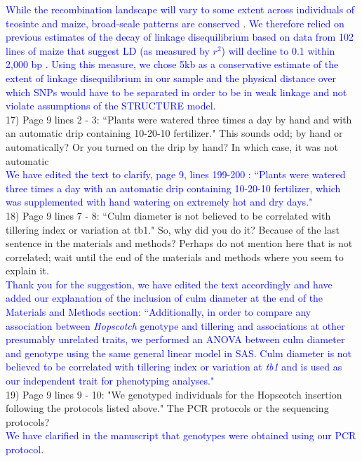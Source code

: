 \documentclass[11pt]{article}
\newcommand{\res}[1]{\noindent \textcolor{blue}{{#1}} \\}
\begin{document}
\res{While the recombination landscape will vary to some extent across individuals of teosinte and maize, broad-scale patterns are conserved \citep{bauer2013}.  We therefore relied on previous estimates of the decay of linkage disequilibrium based on data from 102 lines of maize that suggest LD (as measured by $r^2$) will decline to 0.1 within 2,000 bp \citep{Remington2001}.  Using this measure, we chose 5kb as a conservative estimate of the extent of linkage disequilibrium in our sample and the physical distance over which SNPs would have to be separated in order to be in weak linkage and not violate assumptions of the STRUCTURE model.}

17) Page 9 lines 2 - 3: ``Plants were watered three times a day by hand and with an automatic drip containing 10-20-10 fertilizer." This sounds odd; by hand or automatically? Or you turned on the drip by hand? In which case, it was not automatic\\

\res{We have edited the text to clarify, page 9, lines 199-200 : ``Plants were watered three times a day with an automatic drip containing 10-20-10 fertilizer, which was supplemented with hand watering on extremely hot and dry days."}

18) Page 9 lines 7 - 8: ``Culm diameter is not believed to be correlated with tillering index or variation at tb1." So, why did you do it? Because of the last sentence in the materials and methods? Perhaps do not mention here that is not correlated; wait until the end of the materials and methods where you seem to explain it.\\ 

\res{Thank you for the suggestion, we have edited the text accordingly and have added our explanation of the inclusion of culm diameter at the end of the Materials and Methods section: ``Additionally, in order to compare any association between \emph{Hopscotch} genotype and tillering and associations at other presumably unrelated traits, we performed an ANOVA between culm diameter and genotype using the same general linear model in SAS. Culm diameter is not believed to be correlated with tillering index or variation at \emph{tb1} and is used as our independent trait for phenotyping analyses."}

19) Page 9 lines 9 - 10: "We genotyped individuals for the Hopscotch insertion following the protocols listed above." The PCR protocols or the sequencing protocols?\\ 

\res{We have clarified in the manuscript that genotypes were obtained using our PCR protocol.}
\end{document}
